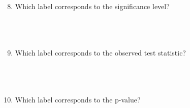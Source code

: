 \documentclass[12pt]{article}
\begin{document}
\begin{enumerate}[leftmargin=\labelsep]
\setcounter{enumi}{7}
\item Which label corresponds to the significance level?\\
\vspace*{.5cm}\\
\hspace*{1cm}{\bf (a) \hfill (b) \hfill (c) \hfill (d)}\hspace*{1cm}\\
\vspace*{.5cm}\\

\item Which label corresponds to the observed test statistic?\\
\vspace*{.5cm}\\
\hspace*{1cm}{\bf (a) \hfill (b) \hfill (c) \hfill (d)}\hspace*{1cm}\\
\vspace*{.5cm}\\

\item Which label corresponds to the p-value?\\
\vspace*{.5cm}\\
\hspace*{1cm}{\bf (a) \hfill (b) \hfill (c) \hfill (d)}\hspace*{1cm}\\
\vspace*{.5cm}\\
\end{enumerate}
\end{document}
